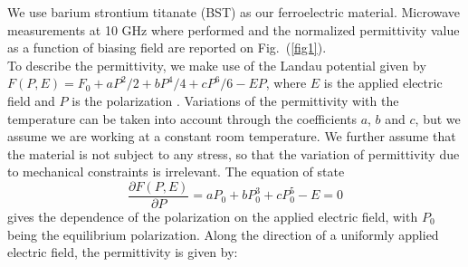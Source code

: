 \documentclass[%
 reprint,
 amsmath,amssymb,
 aps,
]{revtex4-2}
\newcommand{\fig}[1]{Fig.~(\ref{#1})}
\begin{document}
We use barium strontium titanate (BST) as our ferroelectric material. Microwave measurements
at 10 GHz where performed and the normalized permittivity value
as a function of biasing field are reported on \fig{fig1}.\\
To describe the permittivity, we make use of the Landau potential
given by $F(P,E) = F_0 +  a P^2/2 + b P^4/4 + cP^6/6 - EP$, where $E$ is
the applied electric field and $P$ is the polarization \cite{Zhou2008}. Variations of the
permittivity with the temperature can be taken into account through the
 coefficients $a$, $b$ and $c$, but we assume we are working at a constant
room temperature. We further assume that the material is not subject to any stress, so that the variation
of permittivity due to mechanical constraints is irrelevant.
The equation of state $$\frac{\partial F (P, E)}{\partial P}   = a P_0 + b P_0^3 + c P_0^5 - E = 0$$ gives the
dependence of the polarization on the applied electric field,
with $P_0$ being the equilibrium polarization.
Along the direction of a uniformly applied electric field, the permittivity is given by:
\end{document}
